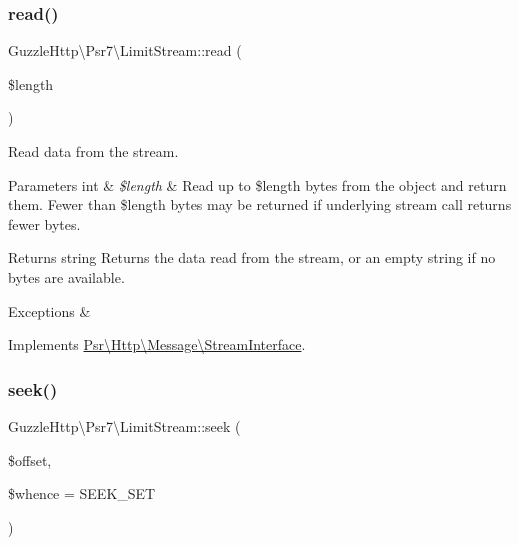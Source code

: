 \subsubsection{\texorpdfstring{read()}{read()}}
{\footnotesize\ttfamily Guzzle\+Http\textbackslash{}\+Psr7\textbackslash{}\+Limit\+Stream\+::read (\begin{DoxyParamCaption}\item[{}]{\$length }\end{DoxyParamCaption})}

Read data from the stream.


\begin{DoxyParams}[1]{Parameters}
int & {\em \$length} & Read up to \$length bytes from the object and return them. Fewer than \$length bytes may be returned if underlying stream call returns fewer bytes. \\
\hline
\end{DoxyParams}
\begin{DoxyReturn}{Returns}
string Returns the data read from the stream, or an empty string if no bytes are available. 
\end{DoxyReturn}

\begin{DoxyExceptions}{Exceptions}
{\em } & \\
\hline
\end{DoxyExceptions}


Implements \hyperlink{interfacePsr_1_1Http_1_1Message_1_1StreamInterface_ad41b4afe827e179dfb4b988e98cccb12}{Psr\textbackslash{}\+Http\textbackslash{}\+Message\textbackslash{}\+Stream\+Interface}.

\mbox{\label{classGuzzleHttp_1_1Psr7_1_1LimitStream_aa1230441e4a3ce17b63330b43f2b038b}} 
\subsubsection{\texorpdfstring{seek()}{seek()}}
{\footnotesize\ttfamily Guzzle\+Http\textbackslash{}\+Psr7\textbackslash{}\+Limit\+Stream\+::seek (\begin{DoxyParamCaption}\item[{}]{\$offset,  }\item[{}]{\$whence = {\ttfamily SEEK\+\_\+SET} }\end{DoxyParamCaption})}

